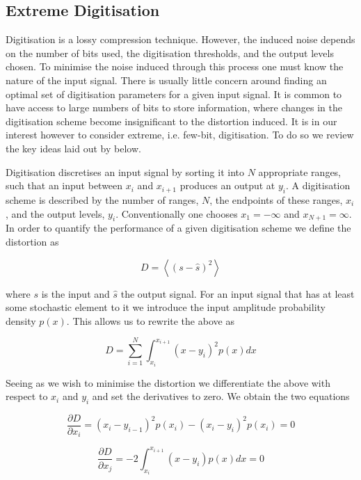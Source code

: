 \documentclass[apj]{emulateapj}
\begin{document}
\subsection{Extreme Digitisation}
\label{subsec:extremedigitisation}

Digitisation is a lossy compression technique. However, the induced noise depends on the number of bits used, the digitisation thresholds, and the output levels chosen. To minimise the noise induced through this process one must know the nature of the input signal. There is usually little concern around finding an optimal set of digitisation parameters for a given input signal. It is common to have access to large numbers of bits to store information, where changes in the digitisation scheme become insignificant to the distortion induced. It is in our interest however to consider extreme, i.e. few-bit, digitisation. To do so we review the key ideas laid out by \cite{max1960} below.

Digitisation discretises an input signal by sorting it into $N$ appropriate ranges, such that an input between $x_i$ and $x_{i+1}$ produces an output at $y_i$. A digitisation scheme is described by the number of ranges, $N$, the endpoints of these ranges, $x_i$, and the output levels, $y_i$. Conventionally one chooses $x_{1} = -\infty$ and $x_{N+1} = \infty$. In order to quantify the performance of a given digitisation scheme we define the distortion as

\[ D = \left\langle  \left( s - \hat{s} \right)^2 \right\rangle \]

where $s$ is the input and $\hat{s}$ the output signal. For an input signal that has at least some stochastic element to it we introduce the input amplitude probability density $p(x)$. This allows us to rewrite the above as

\[ D = \sum_{i = 1}^N \int_{x_i}^{x_{i+1}} \left(x-y_i\right)^2 p(x) dx \]

Seeing as we wish to minimise the distortion we differentiate the above with respect to $x_i$ and $y_i$ and set the derivatives to zero. We obtain the two equations

\begin{equation} \label{eq:distderiv1}
\frac{\partial D}{\partial x_i} = \left(x_i-y_{i-1}\right)^2 p(x_i) - \left(x_i - y_i\right)^2 p(x_i) = 0
\end{equation}

\begin{equation} \label{eq:distderiv2}
\frac{\partial D}{\partial x_j} = -2 \int_{x_i}^{x_{i+1}} \left( x-y_i \right) p(x) dx = 0
\end{equation}
\end{document}
